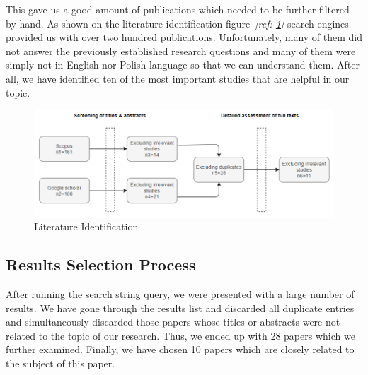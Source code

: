 This gave us a good amount of publications which needed to be further filtered by hand.  As shown on the literature identification figure~\textit{[ref: \ref{fig:literature-identification}]} search engines provided us with over two hundred publications. Unfortunately, many of them did not answer the previously established research questions and many of them were simply not in English nor Polish language so that we can understand them. After all, we have identified ten of the most important studies that are helpful in our topic.

\begin{figure}[htp]
\centering
\includegraphics[width=\linewidth]{img/search_process_new.png}
\caption{Literature Identification}
\label{fig:literature-identification}
\end{figure}

\subsection{Results Selection Process}
After running the search string query, we were presented with a large number of results. We have gone through the results list and discarded all duplicate entries and simultaneously discarded those papers whose titles or abstracts were not related to the topic of our research. Thus, we ended up with 28 papers which we further examined. Finally, we have chosen 10 papers which are closely related to the subject of this paper.
